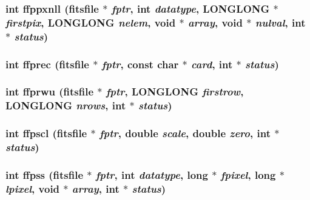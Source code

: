 \subsubsection{\setlength{\rightskip}{0pt plus 5cm}int ffppxnll (\bf{fitsfile} $\ast$ {\em fptr}, int {\em datatype}, \bf{LONGLONG} $\ast$ {\em firstpix}, \bf{LONGLONG} {\em nelem}, void $\ast$ {\em array}, void $\ast$ {\em nulval}, int $\ast$ {\em status})}\label{test_2shm__client_2fitsio_8h_a46e0229ce53eaeb3e024daff7cda152}


\subsubsection{\setlength{\rightskip}{0pt plus 5cm}int ffprec (\bf{fitsfile} $\ast$ {\em fptr}, const char $\ast$ {\em card}, int $\ast$ {\em status})}\label{test_2shm__client_2fitsio_8h_b8a4ffee9072c15ac03cdb0c28a50730}


\subsubsection{\setlength{\rightskip}{0pt plus 5cm}int ffprwu (\bf{fitsfile} $\ast$ {\em fptr}, \bf{LONGLONG} {\em firstrow}, \bf{LONGLONG} {\em nrows}, int $\ast$ {\em status})}\label{test_2shm__client_2fitsio_8h_a9ad4a1b317ff4337067d66288c9a245}


\subsubsection{\setlength{\rightskip}{0pt plus 5cm}int ffpscl (\bf{fitsfile} $\ast$ {\em fptr}, double {\em scale}, double {\em zero}, int $\ast$ {\em status})}\label{test_2shm__client_2fitsio_8h_55e6ba51c52d4c9ea77e745d5029a42c}


\subsubsection{\setlength{\rightskip}{0pt plus 5cm}int ffpss (\bf{fitsfile} $\ast$ {\em fptr}, int {\em datatype}, long $\ast$ {\em fpixel}, long $\ast$ {\em lpixel}, void $\ast$ {\em array}, int $\ast$ {\em status})}\label{test_2shm__client_2fitsio_8h_42bee00082b5cb488fa8a440392392b1}


